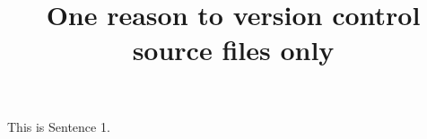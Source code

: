 \documentclass{article}
\title{One reason to version control source files only}
\begin{document}
\maketitle


This is Sentence 1.
\end{document}

